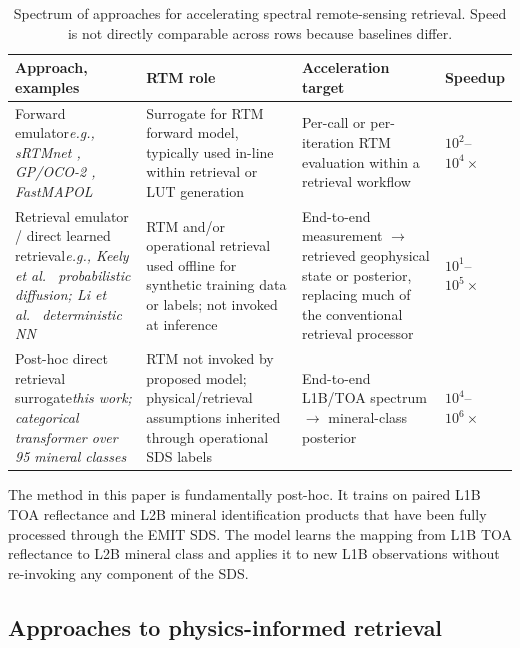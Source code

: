 \documentclass[preprint,12pt]{elsarticle}
\begin{document}
\begin{table}[!htbp]
\centering
\small
\caption{Spectrum of approaches for accelerating spectral remote-sensing retrieval. Speed is not directly comparable across rows because baselines differ.}
\label{tab:emulation_spectrum}
\begin{tabular}{p{}p{}p{}p{}}
\hline
\rowcolor[gray]{0.85}
\textbf{Approach, examples} & \textbf{RTM role} & \textbf{Acceleration target} & \textbf{Speedup} \\
\hline
Forward emulator\newline \emph{e.g., sRTMnet \cite{brodrick2021}, GP/OCO-2 \cite{lamminpaa2025}, FastMAPOL \cite{gao2023}} & Surrogate for RTM forward model, typically used in-line within retrieval or LUT generation & Per-call or per-iteration RTM evaluation within a retrieval workflow & $10^2$--$10^4\times$ \\
\hline
Retrieval emulator / direct learned retrieval\newline \emph{e.g., Keely et al.~\cite{Keely2025ConditionalDiffusionCO2} probabilistic diffusion; Li et al.~\cite{Li2022NO2NN} deterministic NN} & RTM and/or operational retrieval used offline for synthetic training data or labels; not invoked at inference & End-to-end measurement $\to$ retrieved geophysical state or posterior, replacing much of the conventional retrieval processor & $10^1$--$10^5\times$ \\
\hline
Post-hoc direct retrieval surrogate\newline \emph{this work; categorical transformer over 95 mineral classes} & RTM not invoked by proposed model; physical/retrieval assumptions inherited through operational SDS labels & End-to-end L1B/TOA spectrum $\to$ mineral-class posterior & $10^4$--$10^6\times$ \\
\hline
\end{tabular}
\end{table}

The method in this paper is fundamentally post-hoc.
It trains on paired L1B TOA reflectance and L2B mineral identification products that have been fully processed through the EMIT SDS.
The model learns the mapping from L1B TOA reflectance to L2B mineral class and applies it to new L1B observations without re-invoking any component of the SDS.

\subsection{Approaches to physics-informed retrieval}
\label{subsec:physics_informed_approaches}
\end{document}
